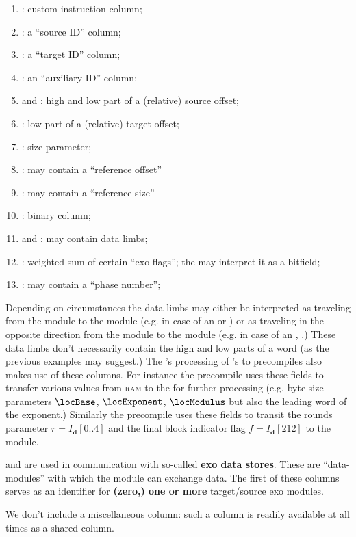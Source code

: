 \begin{enumerate}[resume]
	\item \miscMmuInst{}:
		custom \mmuMod{} instruction column;
	\item \miscMmuSrcId{}:
		a ``source ID'' column;
	\item \miscMmuTgtId{}:
		a ``target ID'' column;
	\item \miscMmuAuxId{}:
		an ``auxiliary ID'' column;
	\item \miscMmuSrcOffsetHi{} and \miscMmuSrcOffsetLo{}:
		high and low part of a (relative) source offset;
	\item \miscMmuTgtOffsetLo{}:
		low part of a (relative) target offset;
	\item \miscMmuSize{}:
		size parameter;
	\item \miscMmuRefOffset{}:
		may contain a ``reference offset''
	\item \miscMmuRefSize{}:
		may contain a ``reference size''
	\item \miscMmuSuccessBit{}:
		binary column;
	\item \miscMmuLimbOne{} and \miscMmuLimbTwo{}:
		may contain data limbs;
	\item \miscMmuExoSum{}:
		weighted sum of certain ``exo flags'';
		the \mmioMod{} may interpret it as a bitfield;
	\item \miscMmuPhase{}:
		may contain a ``phase number'';
\end{enumerate}
Depending on circumstances the data limbs may either be interpreted
as traveling from the \hubMod{} module to the \mmuMod{} module (e.g. in case of an  or ) or
as traveling in the opposite direction from the \mmuMod{} module to the  \hubMod{} module (e.g. in case of an , .)
These data limbs don't necessarily contain the high and low parts of a \evm{} word (as the previous examples may suggest.)
The \hubMod{}'s processing of 's to precompiles also makes use of these columns. 
For instance the \instModexp{} precompile uses these fields to transfer various values from \textsc{ram} to the \hubMod{} for further processing
(e.g. byte size parameters $\locBase$, $\locExponent$, $\locModulus$ but also the leading word of the exponent.)
Similarly the \instBlake{} precompile uses these fields to transit
the rounds parameter $r = I_\textbf{d}[0\text{..}4]$ and
the final block indicator flag $f = I_\textbf{d}[212]$
to the \hubMod{} module.

\miscMmuExoSum{} and \miscMmuPhase{} are used in communication with so-called \textbf{exo data stores}.
These are ``data-modules'' with which the \mmioMod{} module can exchange data.
The first of these columns serves as an identifier for \textbf{(zero,) one or more} target/source exo modules. 

\saNote{} We don't include a miscellaneous \mmuStamp{} column: such a column is readily available at all times as a shared column.
